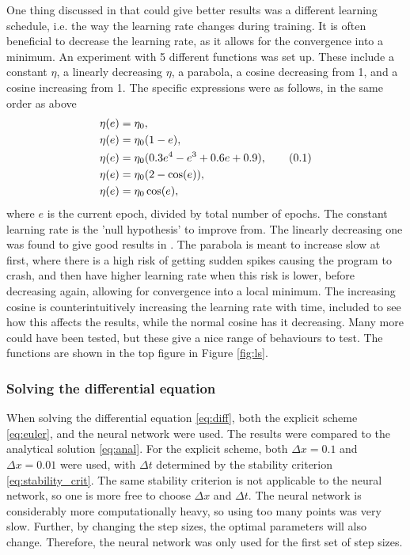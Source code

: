 \documentclass[multicolumn, 9pt]{extarticle}
\newcommand\numberthis{\addtocounter{equation}{1}\tag{\theequation}}
\begin{document}
One thing discussed in \cite{p2HO} that could give better results was a different learning schedule, i.e. the way the learning rate changes during training. It is often beneficial to decrease the learning rate, as it allows for the convergence into a minimum. An experiment with 5 different functions was set up. These include a constant $\eta$, a linearly decreasing $\eta$, a parabola, a cosine decreasing from 1, and a cosine increasing from 1.
The specific expressions were as follows, in the same order as above
\begin{align*}\label{eq:ls}
	\eta(e) & = \eta_0,
	\\
	\eta(e) & = \eta_0 (1 - e),
	\\
	\eta(e) & = \eta_0 (0.3e^4-e^3+0.6e+0.9), \numberthis
	\\
	\eta(e) & = \eta_0 (2 - \cos(e)),
	\\
	\eta(e) & = \eta_0 \cos(e),
\end{align*}
where $e$ is the current epoch, divided by total number of epochs. The constant learning rate is the 'null hypothesis' to improve from. The linearly decreasing one was found to give good results in \cite{p2HO}. The parabola is meant to increase slow at first, where there is a high risk of getting sudden spikes causing the program to crash, and then have higher learning rate when this risk is lower, before decreasing again, allowing for convergence into a local minimum. The increasing cosine is counterintuitively increasing the learning rate with time, included to see how this affects the results, while the normal cosine has it decreasing. Many more could have been tested, but these give a nice range of behaviours to test. The functions are shown in the top figure in Figure \ref{fig:ls}.

\subsubsection{Solving the differential equation}
When solving the differential equation \eqref{eq:diff}, both the explicit scheme \eqref{eq:euler}, and the neural network were used. The results were compared to the analytical solution \eqref{eq:anal}. For the explicit scheme, both $\Delta x=0.1$ and $\Delta x=0.01$ were used, with $\Delta t$ determined by the stability criterion \eqref{eq:stability_crit}. The same stability criterion is not applicable to the neural network, so one is more free to choose $\Delta x$ and $\Delta t$. The neural network is considerably more computationally heavy, so using too many points was very slow. Further, by changing the step sizes, the optimal parameters will also change. Therefore, the neural network was only used for the first set of step sizes.
\end{document}
